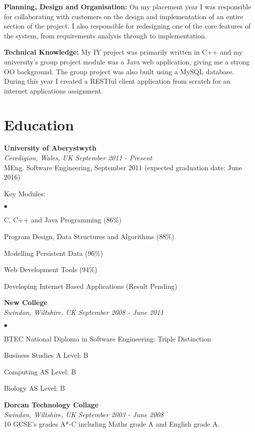 \documentclass[margin,line]{res}
\newenvironment{list2}{
  \begin{list}{$\bullet$}{%
      \setlength{\itemsep}{0in}
      \setlength{\parsep}{0in} \setlength{\parskip}{0in}
      \setlength{\topsep}{0in} \setlength{\partopsep}{0in}
      \setlength{\leftmargin}{0.2in}}}{\end{list}}
\begin{document}
\begin{resume}
{\bf Planning, Design and Organisation:} On my placement year I was responsible for collaborating with customers on the design and implementation of an entire section of the project. I also responsible for redesigning one of the core features of the system, from requirements analysis through to implementation.

{\bf Technical Knowledge:} My IY project was primarily written in C++ and my university's group project module was a Java web application, giving me a strong OO background. The group project was also built using a MySQL database. During this year I created a RESTful client application from scratch for an internet applications assignment.

\section{\sc Education}
{\bf University of Aberystwyth}\\
{\it Ceredigion, Wales, UK} \hfill {\it September 2011 - Present}\\
MEng. Software Engineering, September 2011 (expected graduation date: June 2016)

Key Modules:
\begin{list2}

\item C, C++ and Java Programming (86\%)
\item Program Design, Data Structures and Algorithms (88\%)
\item Modelling Persistent Data (96\%)
\item Web Development Tools (94\%)
\item Developing Internet Based Applications (Result Pending)
\end{list2}

{\bf New College}\\
{\it Swindon, Wiltshire, UK} \hfill {\it September 2008 - June 2011}
\begin{list2}
\item BTEC National Diploma in Software Engineering: Triple Distinction
\item Business Studies A Level: B
\item Computing AS Level: B
\item Biology AS Level: B
\end{list2}

{\bf Dorcan Technology Collage} \\
{\it Swindon, Wiltshire, UK} \hfill {\it September 2003 - June 2008}\\
10 GCSE's grades A*-C including Maths grade A and English grade A.


\end{resume}
\end{document}
